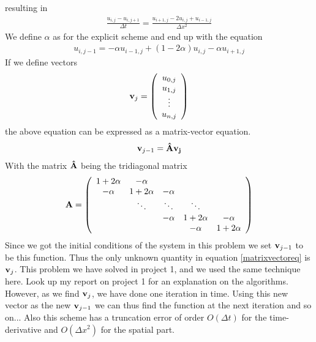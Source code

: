 \documentclass[norsk, a4paper]{article}
\begin{document}
resulting in 
\begin{align*}
\frac{u_{i,j}-u_{i,j+1}}{\Delta t} = \frac{u_{i+1,j}-2u_{i,j} + u_{i-1,j}}{\Delta x^2} 
\end{align*}
We define $\alpha$ as for the explicit scheme and end up with the equation
\begin{align}
u_{i,j-1} = -\alpha u_{i-1,j} + (1-2\alpha)u_{i,j} - \alpha u_{i+1,j} \label{impalgo}
\end{align}
If we define vectors 
\begin{equation*}
    {\bf v}_j = \left(\begin{array}{c}
                           u_{0,j} \\
                           u_{1,j} \\
                           \vdots \\
                           u_{n,j}
                      \end{array} \right)
\end{equation*}
the above equation can be expressed as a matrix-vector equation. 
\begin{align}
{\bf v}_{j-1} = {\bf \hat{A}  v_j} \label{matrixvectoreq}
\end{align}
With the matrix ${\bf \hat{A}}$ being the tridiagonal matrix
\begin{equation*}
    {\bf A} = \left(\begin{array}{ccccc}
                           1+2\alpha &-\alpha  & & & \\
                           -\alpha &1+2\alpha &-\alpha  & & \\
                            &\ddots &\ddots &\ddots  & \\
                            &  &-\alpha &1+2\alpha &-\alpha \\
                            &  & &-\alpha &1+2\alpha \\
                      \end{array} \right)
\end{equation*}
Since we got the initial conditions of the system in this problem we set ${\bf v}_{j-1}$ to be this function. Thus the only unknown quantity in equation \eqref{matrixvectoreq} is ${\bf v}_{j}$. This problem 
we have solved in project 1, and we used the same technique here. Look up my report on project 1 for an explanation on the algorithms. However, as we find ${\bf v}_{j}$, we have done one iteration in time. Using this new vector as the new ${\bf v}_{j-1}$ we can thus find the function at the next iteration and so on... Also this scheme has a truncation error of order $O(\Delta t)$ for the time-derivative and $O(\Delta x^2)$ for the spatial part.
\end{document}
